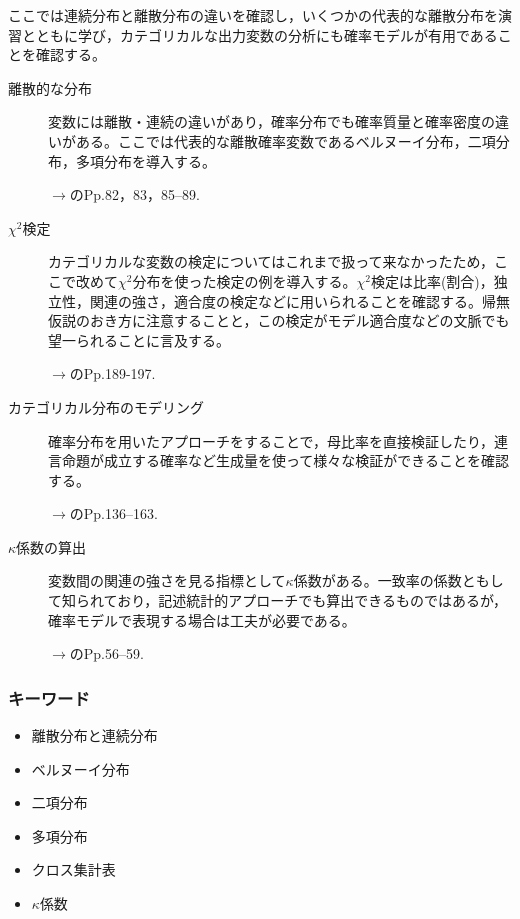 ここでは連続分布と離散分布の違いを確認し，いくつかの代表的な離散分布を演習とともに学び，カテゴリカルな出力変数の分析にも確率モデルが有用であることを確認する。
\begin{description}
    \item[離散的な分布] 変数には離散・連続の違いがあり，確率分布でも確率質量と確率密度の違いがある。ここでは代表的な離散確率変数であるベルヌーイ分布，二項分布，多項分布を導入する。

    \begin{flushright}
        $\to$\citet{松浦201610}のPp.82，83，85--89.
    \end{flushright}
  

    \item[$\chi^2$検定] カテゴリカルな変数の検定についてはこれまで扱って来なかったため，ここで改めて$\chi^2$分布を使った検定の例を導入する。$\chi^2$検定は比率(割合)，独立性，関連の強さ，適合度の検定などに用いられることを確認する。帰無仮説のおき方に注意することと，この検定がモデル適合度などの文脈でも望一られることに言及する。

    \begin{flushright}
        $\to$\citet{山内201001}のPp.189-197.
    \end{flushright}
    

    \item[カテゴリカル分布のモデリング] 確率分布を用いたアプローチをすることで，母比率を直接検証したり，連言命題が成立する確率など生成量を使って様々な検証ができることを確認する。

    \begin{flushright}
        $\to$\citet{豊田201606}のPp.136--163.
    \end{flushright}
    
    \item[$\kappa$係数の算出] 変数間の関連の強さを見る指標として$\kappa$係数がある。一致率の係数ともして知られており，記述統計的アプローチでも算出できるものではあるが，確率モデルで表現する場合は工夫が必要である。

    \begin{flushright}
        $\to$\citet{Lee201709}のPp.56--59.
    \end{flushright}
    
\end{description}
\subsubsection{キーワード}
\begin{itemize}
    \item 離散分布と連続分布
    \item ベルヌーイ分布
    \item 二項分布
    \item 多項分布
    \item クロス集計表
    \item $\kappa$係数
\end{itemize}
